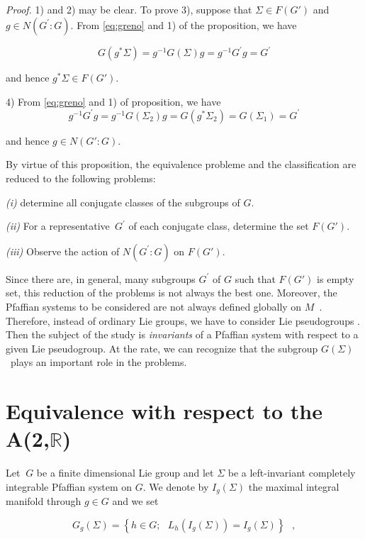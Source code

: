 \documentclass{amsproc}
\theoremstyle{remark}
\numberwithin{equation}{section}
\begin{document}
\textit{Proof.} 1) and 2) may be clear. To prove 3), suppose that $\Sigma
\in F(G')$ and $g\in N(G^{\prime }:G)$. From \eqref{eq:greno} and
1) of the proposition, we have

\begin{equation*}
G(g^{\ast }\Sigma )=g^{-1}G(\Sigma )g=g^{-1}G^{\prime }g=G^{\prime }
\end{equation*}

and hence $g^{\ast }\Sigma \in F(G')$.

4) From \eqref{eq:greno} and 1) of proposition, we have\begin{equation*}
g^{-1}G^{\prime }g=g^{-1}G(\Sigma _{2})g=G(g^{\ast }\Sigma _{2})=G(\Sigma
_{1})=G^{\prime }
\end{equation*}

and hence $g\in N(G':G)$.\

By virtue of this proposition, the equivalence probleme and the
classification are reduced to the following problems:

\textit{(i) }determine all conjugate classes of the subgroups of $G$.

\textit{(ii) }For a representative\textit{\ }$G^{\prime }$ of each conjugate
class, determine the set $F(G')$.

\textit{(iii) }Observe the action of $N(G^{\prime }:G)$ on $F(G')$. \ 

Since there are, in general, many subgroups $G^{\prime }$ of $G$ such that $F(G')$ is empty set, this reduction of the problems is
not always the best one. Moreover, the Pfaffian systems to be considered are
not always defined globally on $M$\ . Therefore, instead of ordinary Lie
groups, we have to consider Lie pseudogroups \cite{Ca1, KR, Ol1, Ol3}.
Then the subject of the study is {\em invariants} of a Pfaffian system with respect to a given
Lie pseudogroup. At the rate, we can recognize that the subgroup $G(\Sigma )$\ plays an important role in the problems.\ \ \ \ \ \ \ \ \ \ \ \ \ \ \ \ \

\section{Equivalence with respect to the A(2,$\mathbb{R}
$)}

Let $\ G$ be a finite dimensional Lie group and let $\Sigma$ be a
left-invariant completely integrable Pfaffian system on $G$. We denote by $I_{g}(\Sigma )$ the maximal integral manifold through $g\in G$ and we set

\begin{equation*}
G_{g}(\Sigma )=\left\{ h\in G;\text{ }L_{h}(I_{g}(\Sigma ))=I_{g}(\Sigma
)\right\} \text{ },
\end{equation*}
\end{document}
